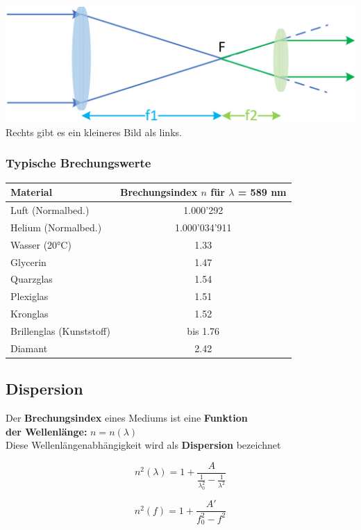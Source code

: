 \includegraphics[width=0.9\linewidth]{Bilder/Wellen-Optik/linsen}\\

Rechts gibt es ein kleineres Bild als links.

\subsubsection{Typische Brechungswerte}

\begin{tabular}{| l | c |}
	\hline
	\textbf{Material} & \textbf{Brechungsindex $n$ für $\lambda$ = 589 nm} \\ \hline
	Luft (Normalbed.)        & 1.000'292 \\ \hline
	Helium (Normalbed.)      & 1.000'034'911 \\ \hline
	Wasser (20°C)            & 1.33 \\ \hline
	Glycerin                 & 1.47 \\ \hline
	Quarzglas                & 1.54 \\ \hline
	Plexiglas                & 1.51 \\ \hline
	Kronglas                 & 1.52 \\ \hline
	Brillenglas (Kunststoff) & bis 1.76 \\ \hline
	Diamant                  & 2.42 \\ \hline
\end{tabular}



\subsection{Dispersion}
\label{Dispersion Optik}


Der \textbf{Brechungsindex} eines Mediums ist eine \textbf{Funktion \\
der Wellenlänge:} $n = n(\lambda)$ \\
Diese Wellenlängenabhängigkeit wird als \textbf{Dispersion} bezeichnet \\


\begin{minipage}{0.48\linewidth}
$$ \boxed{ n^2(\lambda) = 1 + \frac{A}{ \frac{1}{\lambda_0^2} -  \frac{1}{\lambda^2} }  }  $$
\end{minipage}
\hfill
\begin{minipage}{0.48\linewidth}
$$ \boxed{ n^2(f) = 1 + \frac{A'}{f_0^2 - f^2}  }  $$
\end{minipage}


